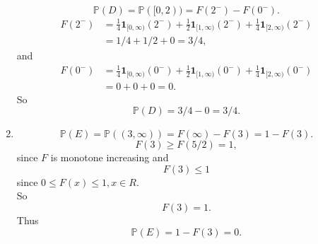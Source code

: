 \documentclass{article}
\newcommand{\bbp}{\mathbb{P}}
\begin{document}
\begin{enumerate}[(1)]
		$$\bbp(D) = \bbp([0,2)) = F(2^-) - F(0^-).$$
		\begin{align*}
			F(2^-) &=  \frac{1}{4}\mathbf{1}_{[0, \infty)}(2^-) + \frac{1}{2}\mathbf{1}_{[1,\infty)}(2^-) + \frac{1}{4}\mathbf{1}_{[2,\infty)}(2^-) \\
				   &= 1/4+ 1/2+ 0  = 3/4,
		\end{align*}
		and
		\begin{align*}
        	F(0^-) &=  \frac{1}{4}\mathbf{1}_{[0, \infty)}(0^-) + \frac{1}{2}\mathbf{1}_{[1,\infty)}(0^-) + \frac{1}{4}\mathbf{1}_{[2,\infty)}(0^-) \\
        		   &= 0 + 0 + 0 = 0.
        \end{align*}
        So
        $$\bbp(D) = 3/4 - 0 =3/4.$$
	\item
		$$\bbp(E) = \bbp((3,\infty)) = F(\infty) - F(3) = 1 - F(3).$$
		$$F(3) \geq F(5/2) = 1,$$ since $F$ is monotone increasing and
		$$F(3) \leq 1$$ since $0\leq F(x) \leq 1, x \in R$.\\
		So $$F(3) = 1.$$
		Thus $$\bbp(E) = 1 - F(3) = 0.$$

\end{enumerate}	
\end{document}
